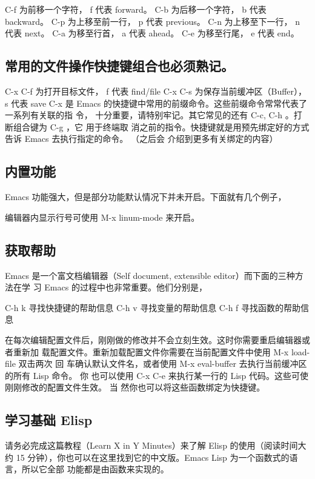 \documentclass[11pt]{ctexart}
\begin{document}
C-f 为前移一个字符， f 代表 forward。
C-b 为后移一个字符， b 代表 backward。
C-p 为上移至前一行， p 代表 previous。
C-n 为上移至下一行， n 代表 next。
C-a 为移至行首， a 代表 ahead。
C-e 为移至行尾， e 代表 end。
\subsection{常用的文件操作快捷键组合也必须熟记。}
\label{sec:org1a0ec5e}

C-x C-f 为打开目标文件， f 代表 find/file
C-x C-s 为保存当前缓冲区（Buffer）， s 代表 save
C-x 是 Emacs 的快捷键中常用的前缀命令。这些前缀命令常常代表了一系列有关联的指 令，
十分重要，请特别牢记。其它常见的还有 C-c, C-h 。打断组合键为 C-g ，它 用于终端取
消之前的指令。快捷键就是用预先绑定好的方式告诉 Emacs 去执行指定的命令。 （之后会
介绍到更多有关绑定的内容）
\subsection{内置功能}
\label{sec:orgdd3dbe4}

Emacs 功能强大，但是部分功能默认情况下并未开启。下面就有几个例子，

编辑器内显示行号可使用 M-x linum-mode 来开启。

\subsection{获取帮助}
\label{sec:orgf3c5dff}

Emacs 是一个富文档编辑器（Self document, extensible editor）而下面的三种方法在学 习 Emacs 的过程中也非常重要。他们分别是，

C-h k 寻找快捷键的帮助信息
C-h v 寻找变量的帮助信息
C-h f 寻找函数的帮助信息

在每次编辑配置文件后，刚刚做的修改并不会立刻生效。这时你需要重启编辑器或者重新加
载配置文件。重新加载配置文件你需要在当前配置文件中使用 M-x load-file 双击两次 回
车确认默认文件名，或者使用 M-x eval-buffer 去执行当前缓冲区的所有 Lisp 命令。 你
也可以使用 C-x C-e 来执行某一行的 Lisp 代码。这些可使刚刚修改的配置文件生效。 当
然你也可以将这些函数绑定为快捷键。
\subsection{学习基础 Elisp}
\label{sec:org71b6104}

请务必完成这篇教程（Learn X in Y Minutes）来了解 Elisp 的使用（阅读时间大约 15 分钟），你也可以在这里找到它的中文版。Emacs Lisp 为一个函数式的语言，所以它全部 功能都是由函数来实现的。
\end{document}
